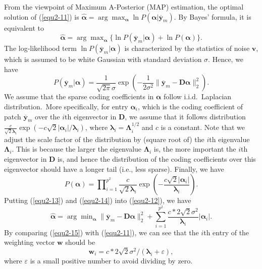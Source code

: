 From the viewpoint of Maximum A-Posterior (MAP) estimation, the optimal solution of (\ref{equ2-11}) is $\hat{\bm{\alpha}} = \arg\max\nolimits_{\bm{\alpha}}\ln P(\bm{\alpha}|\bm{\overline{y}}_{m})$. By Bayes' formula, it is equivalent to
\begin{equation}
\label{equ2-12}
\hat{\bm{\alpha}} = \arg\max\nolimits_{\bm{\alpha}}\{\ln P(\bm{\overline{y}}_{m}|\bm{\alpha})+\ln P(\bm{\alpha})\}.
\end{equation}
The log-likelihood term $\ln P(\bm{\overline{y}}_{m}|\bm{\alpha})$ is characterized by the statistics of noise $\bm{v}$, which is assumed to be white Gaussian with standard deviation $\sigma$. Hence, we have
\begin{equation}
\label{equ2-13}
P(\bm{\overline{y}}_{m}|\bm{\alpha}) = \frac{1}{\sqrt{2\pi}\sigma}\exp(-\frac{1}{2\sigma^{2}}\|\bm{\overline{y}}_{m}-\bm{D}\bm{\alpha}\|_{2}^{2}).
\end{equation}
We assume that the sparse coding coefficients in $\bm{\alpha}$ follow i.i.d.\ Laplacian distribution.\ More specifically, for entry $\bm{\alpha}_{i}$, which is the coding coefficient of patch $\bm{\overline{y}}_{m}$ over the $i$th eigenvector in $\bm{D}$, we assume that it follows distribution $\frac{c}{\sqrt{2}\bm{\lambda}_{i}}\exp(-c\sqrt{2}|\bm{\alpha}_{i}|/\bm{\lambda}_{i})$, where $\bm{\lambda}_{i}=\bm{\Lambda}_{i}^{1/2}$ and $c$ is a constant. Note that we adjust the scale factor of the distribution by (square root of) the $i$th eigenvalue $\bm{\Lambda}_{i}$. This is because the larger the eigenvalue $\bm{\Lambda}_{i}$ is, the more important the $i$th eigenvector in $\bm{D}$ is, and hence the distribution of the coding coefficients over this eigenvector should have a longer tail (i.e., less sparse). Finally, we have
\begin{equation}
\label{equ2-14}
P(\bm{\alpha})=\prod\nolimits_{i=1}^{p^{2}}\frac{c}{\sqrt{2}\bm{\lambda}_{i}}\exp(-\frac{c\sqrt{2}|\bm{\alpha}_{i}|}{\bm{\lambda}_{i}}).
\end{equation}
Putting (\ref{equ2-13}) and (\ref{equ2-14}) into (\ref{equ2-12}), we have
\begin{equation}\label{equ2-15}
\hat{\bm{\alpha}}=\arg\min\nolimits_{\bm{\alpha}}\|\bm{\overline{y}}_{m}-\bm{D}\bm{\alpha}\|_{2}^{2}+\sum_{i=1}^{p^{2}}\frac{c*2\sqrt{2}\sigma^{2}}{\bm{\lambda}_{i}}|\bm{\alpha}_{i}|.
\end{equation}
By comparing (\ref{equ2-15}) with (\ref{equ2-11}), we can see that the $i$th entry of the weighting vector $\bm{w}$ should be
\begin{equation}
\label{equ2-16}
\bm{w}_{i} = c*2\sqrt{2}\sigma^{2}/(\bm{\lambda}_{i}+\varepsilon),
\end{equation}
where $\varepsilon$ is a small positive number to avoid dividing by zero.


